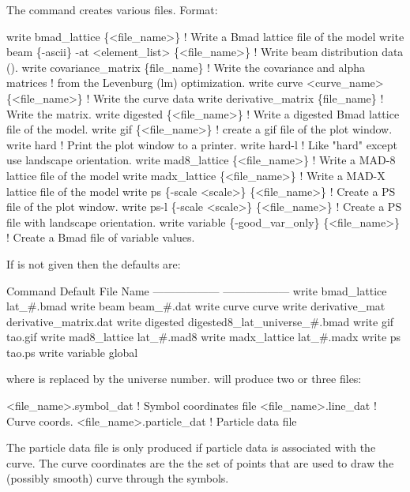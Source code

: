 {{{The  command creates various files.
Format:
\begin{example}
  write bmad_lattice \{<file_name>\}       ! Write a Bmad lattice file of the model
  write beam \{-ascii\} -at <element_list> \{<file_name>\} 
                                         ! Write beam distribution data ().
  write covariance_matrix \{file_name\}    ! Write the covariance and alpha matrices 
                                         !   from the Levenburg (lm) optimization.
  write curve <curve_name> \{<file_name>\} ! Write the curve data
  write derivative_matrix \{file_name\}    ! Write the  matrix.
  write digested \{<file_name>\}     ! Write a digested Bmad lattice file of the model.
  write gif \{<file_name>\}          ! create a gif file of the plot window.
  write hard                       ! Print the plot window to a printer.
  write hard-l                     ! Like "hard" except use landscape orientation. 
  write mad8_lattice \{<file_name>\} ! Write a MAD-8 lattice file of the model
  write madx_lattice \{<file_name>\} ! Write a MAD-X lattice file of the model
  write ps \{-scale <scale>\} \{<file_name>\}      
                                   ! Create a PS file of the plot window.
  write ps-l \{-scale <scale>\} \{<file_name>\}    
                                   ! Create a PS file with landscape orientation.
  write variable \{-good_var_only\} \{<file_name>\} 
                                   ! Create a Bmad file of variable values.
\end{example}

\vskip 0.2in 

If  is not given then the defaults are:
\begin{example}
  Command                         Default File Name
  ------------------              ------------------
  write bmad_lattice             lat_#.bmad
  write beam                     beam_#.dat
  write curve                    curve
  write derivative_mat           derivative_matrix.dat              
  write digested                 digested8_lat_universe_#.bmad
  write gif                      tao.gif
  write mad8_lattice             lat_#.mad8
  write madx_lattice             lat_#.madx
  write ps                       tao.ps
  write variable                 global%
\end{example}
where \vn{\#} is replaced by the universe number.  will produce two or three files: 
\begin{example}
  <file_name>.symbol_dat    ! Symbol coordinates file
  <file_name>.line_dat      ! Curve coords.
  <file_name>.particle_dat  ! Particle data file
\end{example}
The particle data file is only produced if particle
data is associated with the curve.
The curve coordinates are the the set of points that are used to draw the
(possibly smooth) curve through the symbols.

}}}
